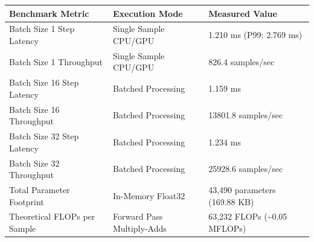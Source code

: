 \begin{tabular}{lll}
\toprule
Benchmark Metric & Execution Mode & Measured Value \\
\midrule
Batch Size 1 Step Latency & Single Sample CPU/GPU & 1.210 ms (P99: 2.769 ms) \\
Batch Size 1 Throughput & Single Sample CPU/GPU & 826.4 samples/sec \\
Batch Size 16 Step Latency & Batched Processing & 1.159 ms \\
Batch Size 16 Throughput & Batched Processing & 13801.8 samples/sec \\
Batch Size 32 Step Latency & Batched Processing & 1.234 ms \\
Batch Size 32 Throughput & Batched Processing & 25928.6 samples/sec \\
Total Parameter Footprint & In-Memory Float32 & 43,490 parameters (169.88 KB) \\
Theoretical FLOPs per Sample & Forward Pass Multiply-Adds & 63,232 FLOPs (\textasciitilde 0.05 MFLOPs) \\
\bottomrule
\end{tabular}
